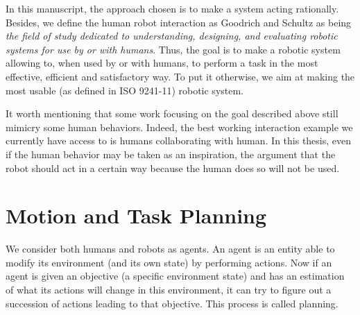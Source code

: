 \documentclass[a4paper,11pt,twoside]{StyleThese}
\begin{document}
In this manuscript, the approach chosen is to make a system acting rationally. Besides, we define the human robot interaction as Goodrich and Schultz as being \textit{the field of study dedicated to understanding, designing, and evaluating robotic systems for use by or with humans}. Thus, the goal is to make a robotic system allowing to, when used by or with humans, to perform a task in the most effective, efficient and satisfactory way. To put it otherwise, we aim at making the most usable (as defined in ISO 9241-11) robotic system.

It worth mentioning that some work focusing on the goal described above still mimicry some human behaviors. Indeed, the best working interaction example we currently have access to is humans collaborating with human. In this thesis, even if the human behavior may be taken as an inspiration, the argument that the robot should act in a certain way because the human does so will not be used.



\section*{Motion and Task Planning}
We consider both humans and robots as agents. An agent is an entity able to modify its environment (and its own state) by performing actions. Now if an agent is given an objective (a specific environment state) and has an estimation of what its actions will change in this environment, it can try to figure out a succession of actions leading to that objective. This process is called planning.



 

\ifdefined{}
\else


\end{document}
